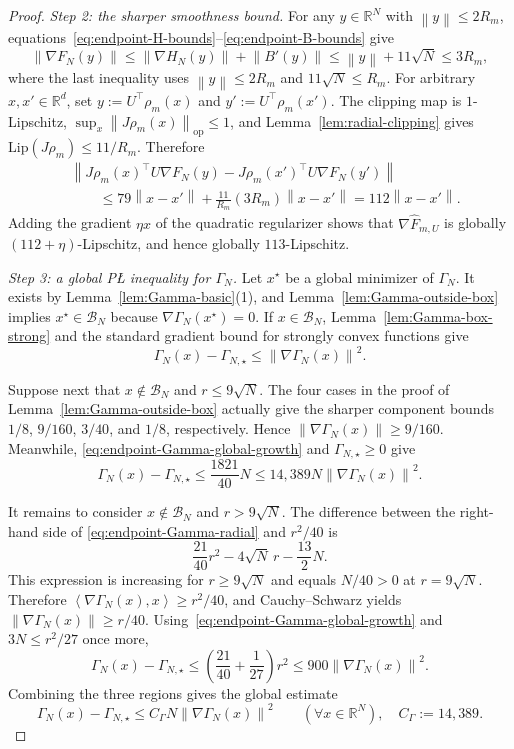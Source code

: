 \documentclass[11pt]{article}
\newcommand{\R}{\mathbb{R}}
\newcommand{\norm}[1]{\left\lVert #1\right\rVert}
\newcommand{\ip}[2]{\left\langle #1,#2\right\rangle}
\begin{document}
\begin{proof}
\emph{Step 2: the sharper smoothness bound.}
For any $y\in\R^N$ with $\norm{y}\le2R_m$, equations~\eqref{eq:endpoint-H-bounds}--\eqref{eq:endpoint-B-bounds}
give
\[
\norm{\nabla F_N(y)}
\le
\norm{\nabla H_N(y)}+\norm{B'(y)}
\le
\norm{y}+11\sqrt N
\le
3R_m,
\]
where the last inequality uses $\norm{y}\le2R_m$ and $11\sqrt N\le R_m$. For arbitrary $x,x'\in\R^d$, set
$y:=U^\top\rho_m(x)$ and $y':=U^\top\rho_m(x')$. The clipping map is $1$-Lipschitz,
$\sup_x\norm{J\rho_m(x)}_{\mathrm{op}}\le1$, and Lemma~\ref{lem:radial-clipping} gives
$\mathrm{Lip}(J\rho_m)\le11/R_m$. Therefore
\begin{align*}
&\norm{J\rho_m(x)^\top U\nabla F_N(y)-J\rho_m(x')^\top U\nabla F_N(y')}\\
&\qquad\le
79\norm{x-x'}+\frac{11}{R_m}(3R_m)\norm{x-x'}
=112\norm{x-x'}.
\end{align*}
Adding the gradient $\eta x$ of the quadratic regularizer shows that $\nabla\widehat F_{m,U}$ is globally
$(112+\eta)$-Lipschitz, and hence globally $113$-Lipschitz.

\emph{Step 3: a global P\L{} inequality for $\Gamma_N$.}
Let $x^\star$ be a global minimizer of $\Gamma_N$. It exists by Lemma~\ref{lem:Gamma-basic}(1), and
Lemma~\ref{lem:Gamma-outside-box} implies $x^\star\in\mathcal B_N$ because
$\nabla\Gamma_N(x^\star)=0$. If $x\in\mathcal B_N$, Lemma~\ref{lem:Gamma-box-strong} and the standard gradient
bound for strongly convex functions give
\[
\Gamma_N(x)-\Gamma_{N,\star}\le\norm{\nabla\Gamma_N(x)}^2.
\]

Suppose next that $x\notin\mathcal B_N$ and $r\le9\sqrt N$. The four cases in the proof of
Lemma~\ref{lem:Gamma-outside-box} actually give the sharper component bounds
$1/8$, $9/160$, $3/40$, and $1/8$, respectively. Hence
$\norm{\nabla\Gamma_N(x)}\ge9/160$. Meanwhile,
\eqref{eq:endpoint-Gamma-global-growth} and $\Gamma_{N,\star}\ge0$ give
\[
\Gamma_N(x)-\Gamma_{N,\star}
\le\frac{1821}{40}N
\le14{,}389N\norm{\nabla\Gamma_N(x)}^2.
\]

It remains to consider $x\notin\mathcal B_N$ and $r>9\sqrt N$. The difference between the right-hand side of
\eqref{eq:endpoint-Gamma-radial} and $r^2/40$ is
\[
\frac{21}{40}r^2-4\sqrt N\,r-\frac{13}{2}N.
\]
This expression is increasing for $r\ge9\sqrt N$ and equals $N/40>0$ at $r=9\sqrt N$. Therefore
$\ip{\nabla\Gamma_N(x)}{x}\ge r^2/40$, and Cauchy--Schwarz yields
$\norm{\nabla\Gamma_N(x)}\ge r/40$. Using~\eqref{eq:endpoint-Gamma-global-growth} and
$3N\le r^2/27$ once more,
\[
\Gamma_N(x)-\Gamma_{N,\star}
\le
\left(\frac{21}{40}+\frac{1}{27}\right)r^2
\le900\norm{\nabla\Gamma_N(x)}^2.
\]
Combining the three regions gives the global estimate
\begin{equation}
\label{eq:endpoint-Gamma-global-PL}
\Gamma_N(x)-\Gamma_{N,\star}
\le
C_\Gamma N\norm{\nabla\Gamma_N(x)}^2
\qquad(\forall x\in\R^N),
\quad
C_\Gamma:=14{,}389.
\end{equation}


\end{proof}
\end{document}
